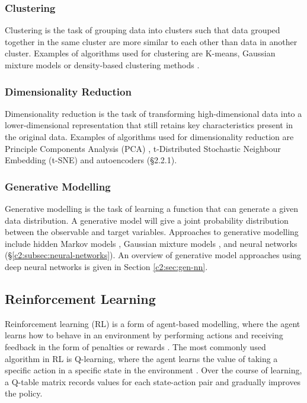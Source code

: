 \subsubsection{Clustering}

Clustering is the task of grouping data into clusters such that data grouped together in the same cluster are more similar to each other than data in another cluster. 
Examples of algorithms used for clustering are K-means, Gaussian mixture models or density-based clustering methods \citep{xu2005survey}.

\subsubsection{Dimensionality Reduction}

Dimensionality reduction is the task of transforming high-dimensional data into a lower-dimensional representation that still retains key characteristics present in the original data. 
Examples of algorithms used for dimensionality reduction are Principle Components Analysis (PCA) \citep{pearson1901liii}, t-Distributed Stochastic Neighbour Embedding (t-SNE) \citep{hinton2002stochastic} and autoencoders (\S2.2.1). 

\subsubsection{Generative Modelling}

Generative modelling is the task of learning a function that can generate a given data distribution. 
A generative model will give a joint probability distribution between the observable and target variables. 
Approaches to generative modelling include hidden Markov models \citep{baum1966statistical}, Gaussian mixture models \citep{dempster1977maximum}, and neural networks (\S \ref{c2:subsec:neural-networks}). 
An overview of generative model approaches using deep neural networks is given in Section \ref{c2:sec:gen-nn}.

\subsection{Reinforcement Learning}
\label{c2:subsec:reinforcement}

Reinforcement learning (RL) is a form of agent-based modelling, where the agent learns how to behave in an environment by performing actions and receiving feedback in the form of penalties or rewards \citep{sutton1999reinforcement}. 
The most commonly used algorithm in RL is Q-learning, where the agent learns the value of taking a specific action in a specific state in the environment \citep{watkins1992q}.
Over the course of learning, a Q-table matrix records values for each state-action pair and gradually improves the policy.

